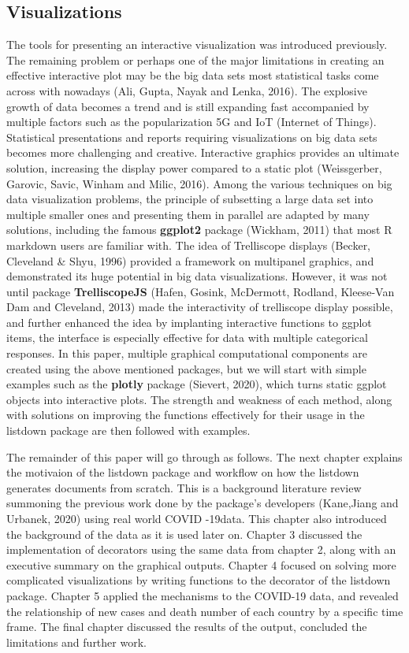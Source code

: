 \documentclass[
]{article}
\begin{document}
\hypertarget{visualizations}{%
\subsection{Visualizations}\label{visualizations}}

The tools for presenting an interactive visualization was introduced
previously. The remaining problem or perhaps one of the major
limitations in creating an effective interactive plot may be the big
data sets most statistical tasks come across with nowadays (Ali, Gupta,
Nayak and Lenka, 2016). The explosive growth of data becomes a trend and
is still expanding fast accompanied by multiple factors such as the
popularization 5G and IoT (Internet of Things). Statistical
presentations and reports requiring visualizations on big data sets
becomes more challenging and creative. Interactive graphics provides an
ultimate solution, increasing the display power compared to a static
plot (Weissgerber, Garovic, Savic, Winham and Milic, 2016). Among the
various techniques on big data visualization problems, the principle of
subsetting a large data set into multiple smaller ones and presenting
them in parallel are adapted by many solutions, including the famous
\textbf{ggplot2} package (Wickham, 2011) that most R markdown users are
familiar with. The idea of Trelliscope displays (Becker, Cleveland \&
Shyu, 1996) provided a framework on multipanel graphics, and
demonstrated its huge potential in big data visualizations. However, it
was not until package \textbf{TrelliscopeJS} (Hafen, Gosink, McDermott,
Rodland, Kleese-Van Dam and Cleveland, 2013) made the interactivity of
trelliscope display possible, and further enhanced the idea by
implanting interactive functions to ggplot items, the interface is
especially effective for data with multiple categorical responses. In
this paper, multiple graphical computational components are created
using the above mentioned packages, but we will start with simple
examples such as the \textbf{plotly} package (Sievert, 2020), which
turns static ggplot objects into interactive plots. The strength and
weakness of each method, along with solutions on improving the functions
effectively for their usage in the listdown package are then followed
with examples.

The remainder of this paper will go through as follows. The next chapter
explains the motivaion of the listdown package and workflow on how the
listdown generates documents from scratch. This is a background
literature review summoning the previous work done by the package's
developers (Kane,Jiang and Urbanek, 2020) using real world COVID
-19data. This chapter also introduced the background of the data as it
is used later on. Chapter 3 discussed the implementation of decorators
using the same data from chapter 2, along with an executive summary on
the graphical outputs. Chapter 4 focused on solving more complicated
visualizations by writing functions to the decorator of the listdown
package. Chapter 5 applied the mechanisms to the COVID-19 data, and
revealed the relationship of new cases and death number of each country
by a specific time frame. The final chapter discussed the results of the
output, concluded the limitations and further work.
\end{document}
